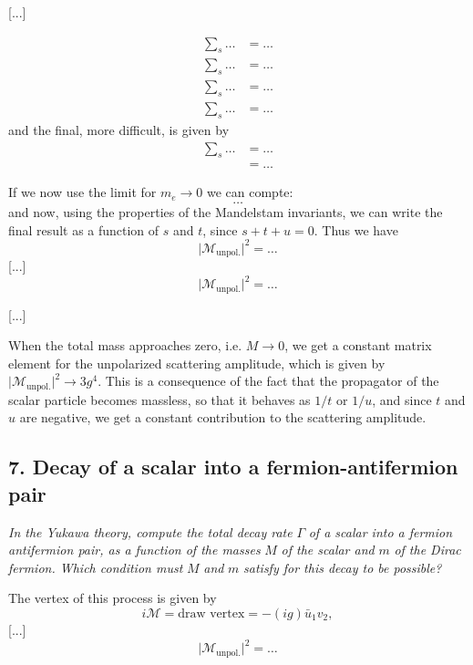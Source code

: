 [...]

\[
    \begin{aligned}
        \sum_{s} \dots & = \dots \\
        \sum_{s} \dots & = \dots \\
        \sum_{s} \dots & = \dots \\
        \sum_{s} \dots & = \dots
    \end{aligned}
\]
and the final, more difficult, is given by
\[
    \begin{aligned}
        \sum_{s} \dots & = \dots \\
                       & = \dots
    \end{aligned}
\]

If we now use the limit for \(m_e \to 0\) we can compte:
\[
    \dots
\]
and now, using the properties of the Mandelstam invariants, we can write the final result as a function of \(s\) and \(t\), since \(s + t + u = 0\). Thus we have
\[
    \vert \mathcal{M}_{\text{unpol.}} \vert^2 = \dots
\]
[...]
\[
    \vert \mathcal{M}_{\text{unpol.}} \vert^2 = \dots
\]

[...]

\begin{remark}
    When the total mass approaches zero, i.e. \(M \to 0\), we get a constant matrix element for the unpolarized scattering amplitude, which is given by \(\vert \mathcal{M}_{\text{unpol.}} \vert^2 \to 3 g^4\). This is a consequence of the fact that the propagator of the scalar particle becomes massless, so that it behaves as \(1/t\) or \(1/u\), and since \(t\) and \(u\) are negative, we get a constant contribution to the scattering amplitude.
\end{remark}

\subsection*{7. Decay of a scalar into a fermion-antifermion pair}

\begin{center}
    \textit{In the Yukawa theory, compute the total decay rate} \( \Gamma \) \textit{of a scalar into a fermion antifermion pair, as a function of the masses} \(M\) \textit{of the scalar and} \(m\) \textit{of the Dirac fermion. Which condition must} \(M\) \textit{and} \(m\) \textit{satisfy for this decay to be possible?}
\end{center}

The vertex of this process is given by
\[
    i \mathcal{M} = \text{draw vertex} = -(ig) \bar{u}_1 v_2,
\]
[...]
\[
    \vert \mathcal{M}_{\text{unpol.}} \vert^2 = \dots
\]

